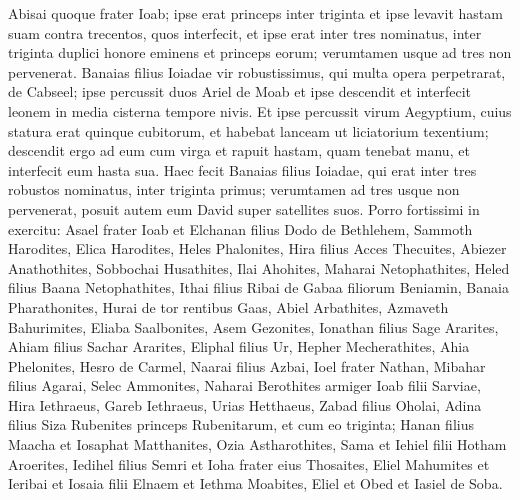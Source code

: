 \begin{biblechapter}
\begin{biblechapter}
\begin{biblechapter}
\begin{biblechapter}
\begin{biblechapter}
\begin{biblechapter}
\begin{biblechapter}
\begin{biblechapter}
\begin{biblechapter}
\begin{biblechapter}
\begin{biblechapter}
 \verse Abisai quoque frater Ioab; ipse erat princeps inter triginta et ipse levavit hastam suam contra trecentos, quos interfecit, et ipse erat inter tres nominatus, 
\verse inter triginta duplici honore eminens et princeps eorum; verumtamen usque ad tres non pervenerat. 
\verse Banaias filius Ioiadae vir robustissimus, qui multa opera perpetrarat, de Cabseel; ipse percussit duos Ariel de Moab et ipse descendit et interfecit leonem in media cisterna tempore nivis. 
\verse Et ipse percussit virum Aegyptium, cuius statura erat quinque cubitorum, et habebat lanceam ut liciatorium texentium; descendit ergo ad eum cum virga et rapuit hastam, quam tenebat manu, et interfecit eum hasta sua. 
 \verse Haec fecit Banaias filius Ioiadae, qui erat inter tres robustos nominatus, 
 \verse inter triginta primus; verumtamen ad tres usque non pervenerat, posuit autem eum David super satellites suos.
 \verse Porro fortissimi in exercitu: Asael frater Ioab et Elchanan filius Dodo de Bethlehem, 
\verse Sammoth Harodites, Elica Harodites, Heles Phalonites, 
\verse Hira filius Acces Thecuites, Abiezer Anathothites, 
\verse Sobbochai Husathites, Ilai Ahohites, 
\verse Maharai Netophathites, Heled filius Baana Netophathites, 
 \verse Ithai filius Ribai de Gabaa filiorum Beniamin, Banaia Pharathonites, 
\verse Hurai de tor rentibus Gaas, Abiel Arbathites, 
\verse Azmaveth Bahurimites, Eliaba Saalbonites, 
\verse Asem Gezonites, Ionathan filius Sage Ararites, 
\verse Ahiam filius Sachar Ararites, Eliphal filius Ur, 
\verse Hepher Mecherathites, Ahia Phelonites, 
\verse Hesro de Carmel, Naarai filius Azbai, 
\verse Ioel frater Nathan, Mibahar filius Agarai, 
\verse Selec Ammonites, Naharai Berothites armiger Ioab filii Sarviae, 
\verse Hira Iethraeus, Gareb Iethraeus, 
\verse Urias Hetthaeus, Zabad filius Oholai, 
\verse Adina filius Siza Rubenites princeps Rubenitarum, et cum eo triginta; 
\verse Hanan filius Maacha et Iosaphat Matthanites, 
\verse Ozia Astharothites, Sama et Iehiel filii Hotham Aroerites, 
 \verse Iedihel filius Semri et Ioha frater eius Thosaites, 
\verse Eliel Mahumites et Ieribai et Iosaia filii Elnaem et Iethma Moabites, 
\verse Eliel et Obed et Iasiel de Soba.
 

\end{biblechapter}
\end{biblechapter}
\end{biblechapter}
\end{biblechapter}
\end{biblechapter}
\end{biblechapter}
\end{biblechapter}
\end{biblechapter}
\end{biblechapter}
\end{biblechapter}
\end{biblechapter}
